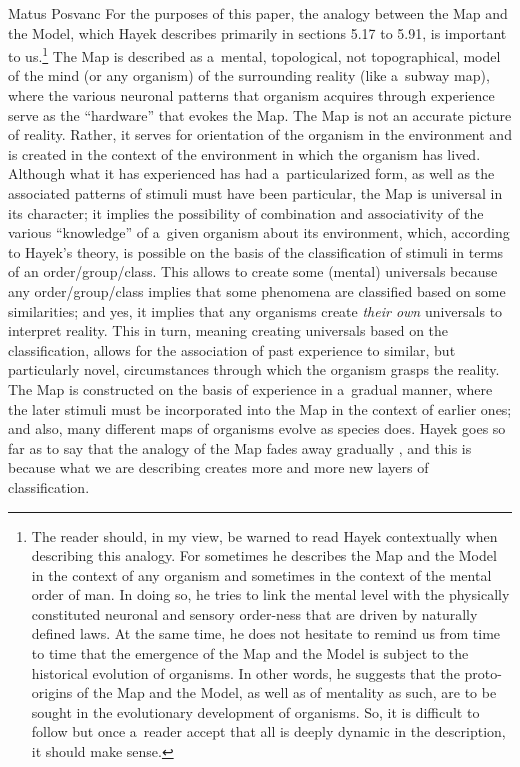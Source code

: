 \begin{artengenv}{Matus Posvanc}
For the purposes of this paper, the analogy between the Map and the Model, which Hayek 
\parencite*[][]{Hayek1952Sensory} %
 describes primarily in sections 5.17 to 5.91, is important to us.\footnote{The reader should, in my view, be warned to read Hayek contextually when describing this analogy. For sometimes he describes the Map and the Model in the context of any organism and sometimes in the context of the mental order of man. In doing so, he tries to link the mental level with the physically constituted neuronal and sensory order-ness that are driven by naturally defined laws. At the same time, he does not hesitate to remind us from time to time that the emergence of the Map and the Model is subject to the historical evolution of organisms. In other words, he suggests that the proto-origins of the Map and the Model, as well as of mentality as such, are to be sought in the evolutionary development of organisms. So, it is difficult to follow but once a~reader accept that all is deeply dynamic in the description, it should make sense.} The Map is described as a~mental, topological, not topographical, model of the mind (or any organism) of the surrounding reality (like a~subway map), where the various neuronal patterns that organism acquires through experience serve as the ``hardware'' that evokes the Map. The Map is not an accurate picture of reality. Rather, it serves for orientation of the organism in the environment and is created in the context of the environment in which the organism has lived. Although what it has experienced has had a~particularized form, as well as the associated patterns of stimuli must have been particular, the Map is universal in its character; it implies the possibility of combination and associativity of the various ``knowledge'' of a~given organism about its environment, which, according to Hayek's theory, is possible on the basis of the classification of stimuli in terms of an order/group/class. This allows to create some (mental) universals because any order/group/class implies that some phenomena are classified based on some similarities; and yes, it implies that any organisms create \textit{their own} universals to interpret reality. This in turn, meaning creating universals based on the classification, allows for the association of past experience to similar, but particularly novel, circumstances through which the organism grasps the reality. The Map is constructed on the basis of experience in a~gradual manner, where the later stimuli must be incorporated into the Map in the context of earlier ones; and also, many different maps of organisms evolve as species does. Hayek goes so far as to say that the analogy of the Map fades away gradually 
\parencite[][sec.5.30]{Hayek1952Sensory}, %
 and this is because what we are describing creates more and more new layers of classification.




\end{artengenv}
